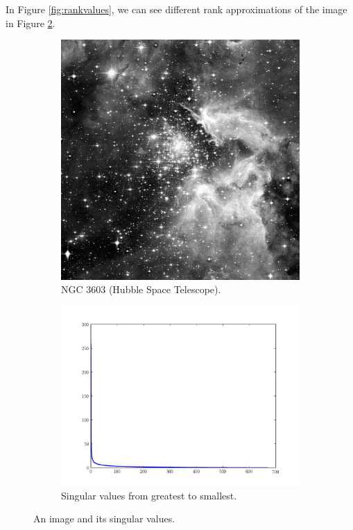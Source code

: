 In Figure \ref{fig:rankvalues}, we can see different rank approximations of the image in Figure \ref{fig:hubble}.

\begin{figure}
\centering
\begin{subfigure}[b]{.49\textwidth}
\centering
\includegraphics[width=\textwidth]{hubble_red}
\caption{NGC 3603 (Hubble Space Telescope).}
\end{subfigure}
\begin{subfigure}[b]{.49\textwidth}
\centering
\includegraphics[width=\textwidth]{hubble_svals}
\caption{Singular values from greatest to smallest.}
\label{fig:svals_plot}
\end{subfigure}
\caption{An image and its singular values.}
\label{fig:hubble}
\end{figure}

